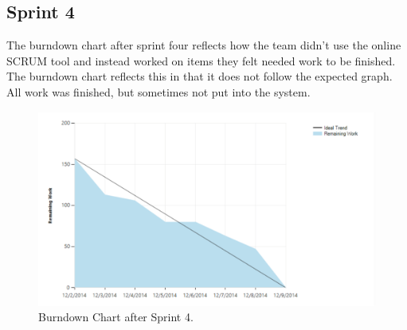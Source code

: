 \subsection{Sprint 4}
The burndown chart after sprint four reflects how the team didn't use the online SCRUM tool and instead worked on items they felt needed work to be finished. The burndown chart reflects this in that it does not follow the expected graph. All work was finished, but sometimes not put into the system. \\

\begin{figure}[H]
	\centering
	\includegraphics[scale=0.40]{Figures/Burndown3}
	\caption{Burndown Chart after Sprint 4.}
\end{figure}